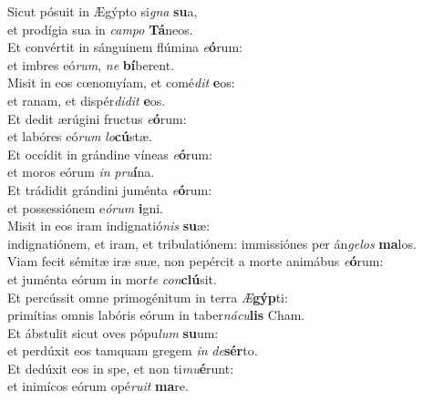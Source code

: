 \evenverse Sicut pósuit in Ægýpto si\textit{gna} \textbf{su}a,~\*\\
\evenverse et prodígia sua in \textit{cam}\textit{po} \textbf{Tá}neos.\\
\oddverse Et convértit in sánguinem flúmina \textit{e}\textbf{ó}rum:~\*\\
\oddverse et imbres eó\textit{rum}, \textit{ne} \textbf{bí}berent.\\
\evenverse Misit in eos cœnomyíam, et comé\textit{dit} \textbf{e}os:~\*\\
\evenverse et ranam, et dispér\textit{di}\textit{dit} \textbf{e}os.\\
\oddverse Et dedit ærúgini fructus \textit{e}\textbf{ó}rum:~\*\\
\oddverse et labóres eó\textit{rum} \textit{lo}\textbf{cú}stæ.\\
\evenverse Et occídit in grándine víneas \textit{e}\textbf{ó}rum:~\*\\
\evenverse et moros eórum \textit{in} \textit{pru}\textbf{í}na.\\
\oddverse Et trádidit grándini juménta \textit{e}\textbf{ó}rum:~\*\\
\oddverse et possessiónem e\textit{ó}\textit{rum} \textbf{i}gni.\\
\evenverse Misit in eos iram indignatió\textit{nis} \textbf{su}æ:~\*\\
\evenverse indignatiónem, et iram, et tribulatiónem: immissiónes per án\textit{ge}\textit{los} \textbf{ma}los.\\
\oddverse Viam fecit sémitæ iræ suæ, non pepércit a morte animábus \textit{e}\textbf{ó}rum:~\*\\
\oddverse et juménta eórum in mor\textit{te} \textit{con}\textbf{clú}sit.\\
\evenverse Et percússit omne primogénitum in terra \textit{Æ}\textbf{gýp}ti:~\*\\
\evenverse primítias omnis labóris eórum in taber\textit{ná}\textit{cu}\textbf{lis} Cham.\\
\oddverse Et ábstulit sicut oves pópu\textit{lum} \textbf{su}um:~\*\\
\oddverse et perdúxit eos tamquam gregem \textit{in} \textit{de}\textbf{sér}to.\\
\evenverse Et dedúxit eos in spe, et non ti\textit{mu}\textbf{é}runt:~\*\\
\evenverse et inimícos eórum opé\textit{ru}\textit{it} \textbf{ma}re.\\
